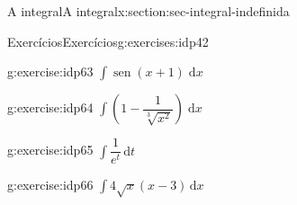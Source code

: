 \documentclass[oneside,10pt,]{article}
\numberwithin{equation}{section}
\newcommand{\dd}{\mathrm{d}}
\DeclareMathOperator{\sin}{sen}
\begin{document}
\begin{sectionptx}{A integral}{}{A integral}{}{}{x:section:sec-integral-indefinida}
\begin{exercises-subsection}{Exercícios}{}{Exercícios}{}{}{g:exercises:idp42}
\begin{exercisegroupcol}{2}
\begin{divisionexerciseegcol}{21}{}{}{g:exercise:idp63}%
\(\displaystyle\int\sin(x+1)\;\dd x\)\end{divisionexerciseegcol}%
\begin{divisionexerciseegcol}{22}{}{}{g:exercise:idp64}%
\(\displaystyle\int\left(1-\dfrac{1}{\sqrt[3]{x^2}}\right)\;\dd x\)\end{divisionexerciseegcol}%
\begin{divisionexerciseegcol}{23}{}{}{g:exercise:idp65}%
\(\displaystyle\int\dfrac{1}{e^t}\,\dd t\)\end{divisionexerciseegcol}%
\begin{divisionexerciseegcol}{24}{}{}{g:exercise:idp66}%
\(\displaystyle\int 4\sqrt{x}\left(x-3\right)\,\dd x\)\end{divisionexerciseegcol}%
\end{exercisegroupcol}
\par\medskip\noindent
\end{exercises-subsection}
\end{sectionptx}
%
%
\typeout{************************************************}
\typeout{************************************************}
%
\end{document}
